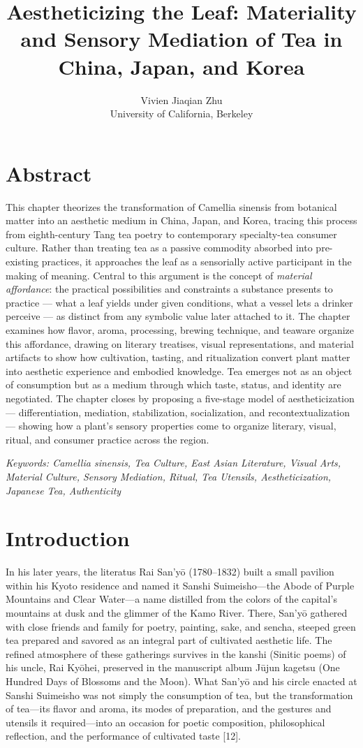 \documentclass[11pt,a4paper]{article}
\title{\textbf{Aestheticizing the Leaf: Materiality and Sensory Mediation of Tea in China, Japan, and Korea}}
\author{Vivien Jiaqian Zhu\\[2pt]\small University of California, Berkeley}
\date{}
\begin{document}
\maketitle

\section*{Abstract}

This chapter theorizes the transformation of Camellia sinensis from botanical matter into an aesthetic medium in China, Japan, and Korea, tracing this process from eighth-century Tang tea poetry to contemporary specialty-tea consumer culture. Rather than treating tea as a passive commodity absorbed into pre-existing practices, it approaches the leaf as a sensorially active participant in the making of meaning. Central to this argument is the concept of \emph{material affordance}: the practical possibilities and constraints a substance presents to practice --- what a leaf yields under given conditions, what a vessel lets a drinker perceive --- as distinct from any symbolic value later attached to it. The chapter examines how flavor, aroma, processing, brewing technique, and teaware organize this affordance, drawing on literary treatises, visual representations, and material artifacts to show how cultivation, tasting, and ritualization convert plant matter into aesthetic experience and embodied knowledge. Tea emerges not as an object of consumption but as a medium through which taste, status, and identity are negotiated. The chapter closes by proposing a five-stage model of aestheticization --- differentiation, mediation, stabilization, socialization, and recontextualization --- showing how a plant's sensory properties come to organize literary, visual, ritual, and consumer practice across the region.

\emph{Keywords: Camellia sinensis, Tea Culture, East Asian Literature, Visual Arts, Material Culture, Sensory Mediation, Ritual, Tea Utensils, Aestheticization, Japanese Tea, Authenticity}

\section{Introduction}

In his later years, the literatus Rai San'yō (1780--1832) built a small pavilion within his Kyoto residence and named it Sanshi Suimeisho---the Abode of Purple Mountains and Clear Water---a name distilled from the colors of the capital's mountains at dusk and the glimmer of the Kamo River. There, San'yō gathered with close friends and family for poetry, painting, sake, and sencha, steeped green tea prepared and savored as an integral part of cultivated aesthetic life. The refined atmosphere of these gatherings survives in the kanshi (Sinitic poems) of his uncle, Rai Kyōhei, preserved in the manuscript album Jūjun kagetsu (One Hundred Days of Blossoms and the Moon). What San'yō and his circle enacted at Sanshi Suimeisho was not simply the consumption of tea, but the transformation of tea---its flavor and aroma, its modes of preparation, and the gestures and utensils it required---into an occasion for poetic composition, philosophical reflection, and the performance of cultivated taste [12].
\end{document}
